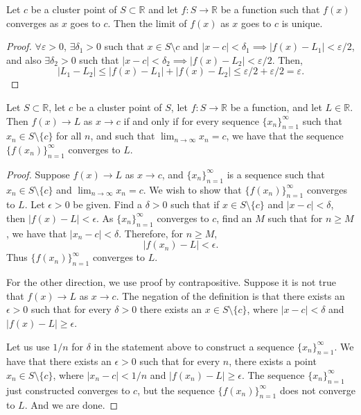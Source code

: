 \documentclass[../main.tex]{subfiles}
\begin{document}
    \begin{proposition}
    Let $c$ be a cluster point of $S \subset \mathbb{R}$ and let $f : S \to \mathbb{R}$ be a function such that $f(x)$ converges as $x$ goes to $c$. Then the limit of $f(x)$ as $x$ goes to $c$ is unique.
    \end{proposition}

    \begin{proof}
    $\forall \varepsilon > 0$, $\exists \delta_1 >0$ such that $x\in S \setminus c$ and $|x-c|<\delta_1 \implies |f(x) - L_1| < \varepsilon/2$, and also
    $\exists \delta_2 > 0$ such that $|x-c|<\delta_2 \implies |f(x) - L_2| < \varepsilon/2$. Then,
    \[
    |L_1 - L_2| \leq |f(x) - L_1| + |f(x) - L_2| \leq \varepsilon/2 + \varepsilon/2 = \varepsilon.
    \]
    \end{proof}
        
    
    
    \begin{lemma}
        Let $S \subset \mathbb{R}$, let $c$ be a cluster point of $S$, let $f : S \to \mathbb{R}$ be a function, and let $L \in \mathbb{R}$. Then $f(x) \to L$ as $x \to c$ if and only if for every sequence $\{x_n\}_{n=1}^{\infty}$ such that $x_n \in S \setminus \{c\}$ for all $n$, and such that $\lim_{n\to\infty} x_n = c$, we have that the sequence $\{f(x_n)\}_{n=1}^{\infty}$ converges to $L$.
    \end{lemma}
        
    \begin{proof}
        Suppose $f(x) \to L$ as $x \to c$, and $\{x_n\}_{n=1}^{\infty}$ is a sequence such that $x_n \in S \setminus \{c\}$ and $\lim_{n\to\infty} x_n = c$. We wish to show that $\{f(x_n)\}_{n=1}^{\infty}$ converges to $L$. Let $\epsilon > 0$ be given. Find a $\delta > 0$ such that if $x \in S \setminus \{c\}$ and $|x - c| < \delta$, then $|f(x) - L| < \epsilon$. As $\{x_n\}_{n=1}^{\infty}$ converges to $c$, find an $M$ such that for $n \geq M$, we have that $|x_n - c| < \delta$. Therefore, for $n \geq M$,
        \[
        |f(x_n) - L| < \epsilon.
        \]
        Thus $\{f(x_n)\}_{n=1}^{\infty}$ converges to $L$.
        
        For the other direction, we use proof by contrapositive. Suppose it is not true that $f(x) \to L$ as $x \to c$. The negation of the definition is that there exists an $\epsilon > 0$ such that for every $\delta > 0$ there exists an $x \in S \setminus \{c\}$, where $|x - c| < \delta$ and $|f(x) - L| \geq \epsilon$.
        
        Let us use $1/n$ for $\delta$ in the statement above to construct a sequence $\{x_n\}_{n=1}^{\infty}$. We have that there exists an $\epsilon > 0$ such that for every $n$, there exists a point $x_n \in S \setminus \{c\}$, where $|x_n - c| < 1/n$ and $|f(x_n) - L| \geq \epsilon$. The sequence $\{x_n\}_{n=1}^{\infty}$ just constructed converges to $c$, but the sequence $\{f(x_n)\}_{n=1}^{\infty}$ does not converge to $L$. And we are done. 
    \end{proof}
        
\end{document}
